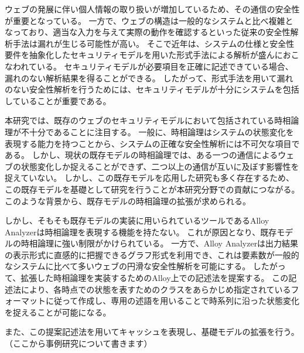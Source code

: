 \documentclass[12pt,a4paper]{jbook}
\begin{document}
ウェブの発展に伴い個人情報の取り扱いが増加しているため、その通信の安全性が重要となっている。
一方で、ウェブの構造は一般的なシステムと比べ複雑となっており、適当な入力を与えて実際の動作を確認するといった従来の安全性解析手法は漏れが生じる可能性が高い。
\color{red}
そこで近年は、システムの仕様と安全性要件を抽象化したセキュリティモデルを用いた形式手法による解析が盛んにおこなわれている。
セキュリティモデルが必要項目を正確に記述できている場合、漏れのない解析結果を得ることができる。
したがって、形式手法を用いて漏れのない安全性解析を行うためには、セキュリティモデルが十分にシステムを包括していることが重要である。
\color{black}

本研究では、既存のウェブのセキュリティモデルにおいて包括されている時相論理が不十分であることに注目する。
一般に、時相論理はシステムの状態変化を表現する能力を持つことから、システムの正確な安全性解析には不可欠な項目である。
しかし、現状の既存モデルの時相論理では、ある一つの通信によるウェブの状態変化しか捉えることができず、二つ以上の通信が互いに及ぼす影響性を捉えていない。
\color{red}
しかし、この既存モデルを応用した研究も多く存在するため、この既存モデルを基礎として研究を行うことが本研究分野での貢献につながる。
\color{black}
このような背景から、既存モデルの時相論理の拡張が求められる。

しかし、そもそも既存モデルの実装に用いられているツールであるAlloy Analyzerは時相論理を表現する機能を持たない。
これが原因となり、既存モデルの時相論理に強い制限がかけられている。
一方で、Alloy Analyzerは出力結果の表示形式に直感的に把握できるグラフ形式を利用でき、これは要素数が一般的なシステムに比べて多いウェブの円滑な安全性解析を可能にする。
したがって、拡張した時相論理を実装するためのAlloy上での記述法を提案する。
この記述法により、各時点での状態を表すためのクラスをあらかじめ指定されているフォーマットに従って作成し、専用の述語を用いることで時系列に沿った状態変化を捉えることが可能になる。

また、この提案記述法を用いてキャッシュを表現し、基礎モデルの拡張を行う。
\\（ここから事例研究について書きます）
\end{document}
